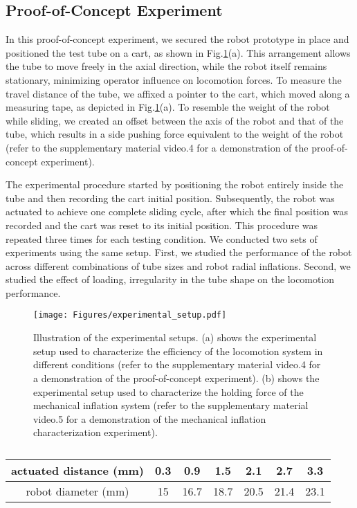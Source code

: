 \documentclass[letterpaper, 10 pt, conference]{ieeeconf}  %
\begin{document}
\subsection*{Proof-of-Concept Experiment}
In this proof-of-concept experiment, we secured the robot prototype in place and positioned the test tube on a cart, as shown in Fig.\ref{fig:setup}(a). This arrangement allows the tube to move freely in the axial direction, while the robot itself remains stationary, minimizing operator influence on locomotion forces. To measure the travel distance of the tube, we affixed a pointer to the cart, which moved along a measuring tape, as depicted in Fig.\ref{fig:setup}(a). To resemble the weight of the robot while sliding, we created an offset between the axis of the robot and that of the tube, which results in a side pushing force equivalent to the weight of the robot (refer to the supplementary material video.4 for a demonstration of the proof-of-concept experiment). 

The experimental procedure started by positioning the robot entirely inside the tube and then recording the cart initial position. Subsequently, the robot was actuated to achieve one complete sliding cycle, after which the final position was recorded and the cart was reset to its initial position. This procedure was repeated three times for each testing condition. We conducted two sets of experiments using the same setup. First, we studied the performance of the robot across different combinations of tube sizes and robot radial inflations. Second, we studied the effect of loading, irregularity in the tube shape on the locomotion performance. 

\begin{figure}[t!]
    \centering
    \texttt{[image: Figures/experimental\_setup.pdf]}
    \caption{Illustration of the experimental setups. (a) shows the experimental setup used to characterize the efficiency of the locomotion system in different conditions (refer to the supplementary material video.4 for a demonstration of the proof-of-concept experiment). (b) shows the experimental setup used to characterize the holding force of the mechanical inflation system (refer to the supplementary material video.5 for a demonstration of the mechanical inflation characterization experiment).}
    \label{fig:setup}
\end{figure}

\begin{table}[b!]
    \centering
    \begin{tabular}{ccccccc}
    \hline
        actuated distance (mm)  & 0.3    & 0.9 & 1.5 & 2.1 & 2.7 & 3.3\\
        \hline
        robot diameter (mm) & 15 & 16.7 & 18.7 & 20.5 & 21.4 & 23.1\\
        \hline
    \end{tabular}
    \caption{}
    \label{table:radialexpansion}
\end{table}
\end{document}
